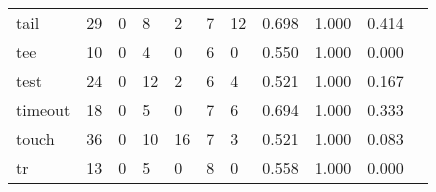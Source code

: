 \begin{longtable}{lp{1.2cm}p{1.2cm}p{1.2cm}p{1.2cm}p{1.2cm}p{1.2cm}p{1.2cm}p{1.2cm}p{1.2cm}p{1.2cm}}
tail      &                                    29 &                                                  0 &                                                  8 &                                                  2 &                                                  7 &                                                 12 &                                         0.698 &                                              1.000 &                                              0.414 \\
tee       &                                    10 &                                                  0 &                                                  4 &                                                  0 &                                                  6 &                                                  0 &                                         0.550 &                                              1.000 &                                              0.000 \\
test      &                                    24 &                                                  0 &                                                 12 &                                                  2 &                                                  6 &                                                  4 &                                         0.521 &                                              1.000 &                                              0.167 \\
timeout   &                                    18 &                                                  0 &                                                  5 &                                                  0 &                                                  7 &                                                  6 &                                         0.694 &                                              1.000 &                                              0.333 \\
touch     &                                    36 &                                                  0 &                                                 10 &                                                 16 &                                                  7 &                                                  3 &                                         0.521 &                                              1.000 &                                              0.083 \\
tr        &                                    13 &                                                  0 &                                                  5 &                                                  0 &                                                  8 &                                                  0 &                                         0.558 &                                              1.000 &                                              0.000 \\

\end{longtable}
